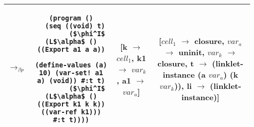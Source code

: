 \begin{table}[h!]
\begin{tabular}{lc|c|c}
    $\longrightarrow_{\beta p}$&\begin{lstlisting}[mathescape]
(program ()
  (seq ((void) t)
        ($\phi^I$ (L$\alpha$ () ((Export a1 a a))
                (define-values (a) 10) (var-set! a1 a) (void)) #:t t)
        ($\phi^I$ (L$\alpha$ () ((Export k1 k k)) ((var-ref k1))) #:t t))))
    \end{lstlisting} & \thead{[k $\rightarrow$ $cell_1$,\\k1 $\rightarrow$ $var_k$,\\a1 $\rightarrow$ $var_a$]} & \thead{[$cell_1$ $\rightarrow$ closure,\\$var_a$ $\rightarrow$ uninit,\\$var_k$ $\rightarrow$ closure,\\t $\rightarrow$ (linklet-instance\\(a $var_a$) (k $var_k$)),\\li $\rightarrow$ (linklet-instance)]} \\ \hline
  \end{tabular}
\end{table}
